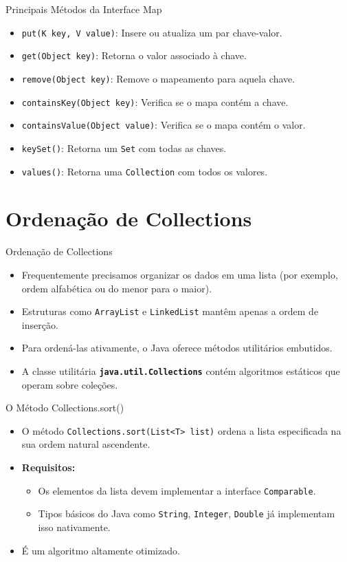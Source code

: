 \documentclass[9pt]{beamer}
\begin{document}
\begin{frame}{Principais Métodos da Interface Map}
    \begin{itemize}
        \item \texttt{put(K key, V value)}: Insere ou atualiza um par chave-valor.
        \item \texttt{get(Object key)}: Retorna o valor associado à chave.
        \item \texttt{remove(Object key)}: Remove o mapeamento para aquela chave.
        \item \texttt{containsKey(Object key)}: Verifica se o mapa contém a chave.
        \item \texttt{containsValue(Object value)}: Verifica se o mapa contém o valor.
        \item \texttt{keySet()}: Retorna um \texttt{Set} com todas as chaves.
        \item \texttt{values()}: Retorna uma \texttt{Collection} com todos os valores.
    \end{itemize}
\end{frame}

\section{Ordenação de Collections}

\begin{frame}{Ordenação de Collections}
    \begin{itemize}
        \item Frequentemente precisamos organizar os dados em uma lista (por exemplo, ordem alfabética ou do menor para o maior).
        \item Estruturas como \texttt{ArrayList} e \texttt{LinkedList} mantêm apenas a ordem de inserção.
        \item Para ordená-las ativamente, o Java oferece métodos utilitários embutidos.
        \item A classe utilitária \textbf{\texttt{java.util.Collections}} contém algoritmos estáticos que operam sobre coleções.
    \end{itemize}
\end{frame}

\begin{frame}{O Método Collections.sort()}
    \begin{itemize}
        \item O método \texttt{Collections.sort(List<T> list)} ordena a lista especificada na sua ordem natural ascendente.
        \item \textbf{Requisitos:}
        \begin{itemize}
            \item Os elementos da lista devem implementar a interface \texttt{Comparable}.
            \item Tipos básicos do Java como \texttt{String}, \texttt{Integer}, \texttt{Double} já implementam isso nativamente.
        \end{itemize}
        \item É um algoritmo altamente otimizado.
    \end{itemize}
\end{frame}
\end{document}
